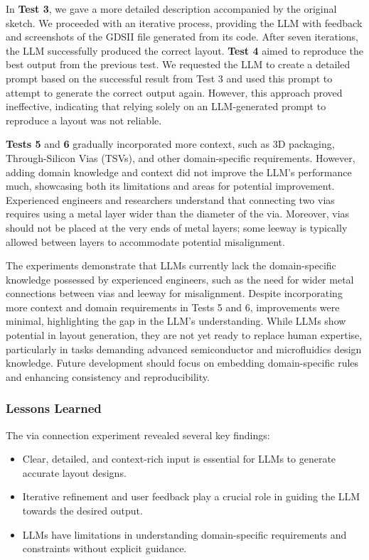\documentclass{article}
\begin{document}
In \textbf{Test 3}, we gave a more detailed description accompanied by the original sketch. We proceeded with an iterative process, providing the LLM with feedback and screenshots of the GDSII file generated from its code. After seven iterations, the LLM successfully produced the correct layout. \textbf{Test 4} aimed to reproduce the best output from the previous test. We requested the LLM to create a detailed prompt based on the successful result from Test 3 and used this prompt to attempt to generate the correct output again. However, this approach proved ineffective, indicating that relying solely on an LLM-generated prompt to reproduce a layout was not reliable.

\textbf{Tests 5} and \textbf{6} gradually incorporated more context, such as 3D packaging, Through-Silicon Vias (TSVs), and other domain-specific requirements. However, adding domain knowledge and context did not improve the LLM's performance much, showcasing both its limitations and areas for potential improvement. Experienced engineers and researchers understand that connecting two vias requires using a metal layer wider than the diameter of the via. Moreover, vias should not be placed at the very ends of metal layers; some leeway is typically allowed between layers to accommodate potential misalignment.

The experiments demonstrate that LLMs currently lack the domain-specific knowledge possessed by experienced engineers, such as the need for wider metal connections between vias and leeway for misalignment. Despite incorporating more context and domain requirements in Tests 5 and 6, improvements were minimal, highlighting the gap in the LLM's understanding. While LLMs show potential in layout generation, they are not yet ready to replace human expertise, particularly in tasks demanding advanced semiconductor and microfluidics design knowledge. Future development should focus on embedding domain-specific rules and enhancing consistency and reproducibility.



\subsubsection{Lessons Learned}
The via connection experiment revealed several key findings:
\begin{itemize}
\item Clear, detailed, and context-rich input is essential for LLMs to generate accurate layout designs.
\item Iterative refinement and user feedback play a crucial role in guiding the LLM towards the desired output.
\item LLMs have limitations in understanding domain-specific requirements and constraints without explicit guidance.
\end{itemize}
\end{document}
